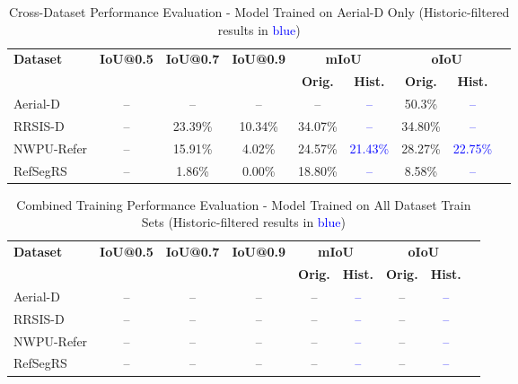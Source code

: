 \begin{table}[H]
\centering
\caption{Cross-Dataset Performance Evaluation - Model Trained on Aerial-D Only (Historic-filtered results in \textcolor{blue}{blue})}
\label{tab:cross_dataset_results}
\begin{tabular}{@{}lcccccccc@{}}
\toprule
\textbf{Dataset} & \textbf{IoU@0.5} & \textbf{IoU@0.7} & \textbf{IoU@0.9} & \multicolumn{2}{c}{\textbf{mIoU}} & \multicolumn{2}{c}{\textbf{oIoU}} \\
\cmidrule(lr){5-6} \cmidrule(lr){7-8}
 & & & & \textbf{Orig.} & \textbf{Hist.} & \textbf{Orig.} & \textbf{Hist.} \\
\midrule
Aerial-D & -- & -- & -- & -- & \textcolor{blue}{--} & 50.3\% & \textcolor{blue}{--} \\
RRSIS-D & -- & 23.39\% & 10.34\% & 34.07\% & \textcolor{blue}{--} & 34.80\% & \textcolor{blue}{--} \\
NWPU-Refer & -- & 15.91\% & 4.02\% & 24.57\% & \textcolor{blue}{21.43\%} & 28.27\% & \textcolor{blue}{22.75\%} \\
RefSegRS & -- & 1.86\% & 0.00\% & 18.80\% & \textcolor{blue}{--} & 8.58\% & \textcolor{blue}{--} \\
\bottomrule
\end{tabular}
\end{table}

\begin{table}[H]
\centering
\caption{Combined Training Performance Evaluation - Model Trained on All Dataset Train Sets (Historic-filtered results in \textcolor{blue}{blue})}
\label{tab:combined_training_results}
\begin{tabular}{@{}lcccccccc@{}}
\toprule
\textbf{Dataset} & \textbf{IoU@0.5} & \textbf{IoU@0.7} & \textbf{IoU@0.9} & \multicolumn{2}{c}{\textbf{mIoU}} & \multicolumn{2}{c}{\textbf{oIoU}} \\
\cmidrule(lr){5-6} \cmidrule(lr){7-8}
 & & & & \textbf{Orig.} & \textbf{Hist.} & \textbf{Orig.} & \textbf{Hist.} \\
\midrule
Aerial-D & -- & -- & -- & -- & \textcolor{blue}{--} & -- & \textcolor{blue}{--} \\
RRSIS-D & -- & -- & -- & -- & \textcolor{blue}{--} & -- & \textcolor{blue}{--} \\
NWPU-Refer & -- & -- & -- & -- & \textcolor{blue}{--} & -- & \textcolor{blue}{--} \\
RefSegRS & -- & -- & -- & -- & \textcolor{blue}{--} & -- & \textcolor{blue}{--} \\
\bottomrule
\end{tabular}
\end{table}

